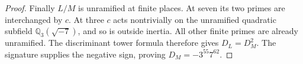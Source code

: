 \begin{proof}
Finally $L/M$ is unramified at finite places.
At seven its two primes are interchanged by $c$.
At three $c$ acts nontrivially on the unramified
quadratic subfield $\mathbb Q_3(\sqrt{-7})$, and
so is outside inertia.  All other finite primes
are already unramified.  The discriminant tower
formula therefore gives $D_L=D_M^2$.
The signature supplies the negative sign, proving
$D_M=-3^{55}7^{62}$.
\end{proof}
